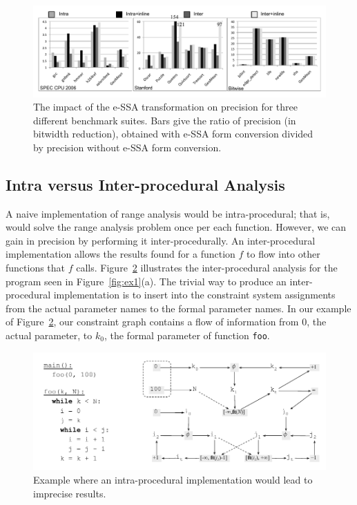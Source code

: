 \documentclass[times]{speauth}
\begin{document}
\begin{figure}[t!]
\begin{center}
\includegraphics[width=1\textwidth]{images/precESSA}
\end{center}
\caption{\label{fig:precESSA}
The impact of the e-SSA transformation on precision for three different
benchmark suites. Bars give the ratio of precision (in bitwidth reduction),
obtained with e-SSA form conversion divided by precision without e-SSA form
conversion.}
\end{figure}

\subsection{Intra versus Inter-procedural Analysis}
\label{sub:whole}

A naive implementation of range analysis would be intra-procedural; that is,
would solve the range analysis problem once per each function.
However, we can gain in precision by performing it inter-procedurally.
An inter-procedural implementation allows the results found for a function $f$
to flow into other functions that $f$ calls.
Figure~\ref{fig:intra} illustrates the inter-procedural analysis for the
program seen in Figure~\ref{fig:ex1}(a).
The trivial way to produce an inter-procedural implementation is to insert
into the constraint system assignments from the actual parameter names to the
formal parameter names.
In our example of Figure~\ref{fig:intra}, our constraint graph contains a flow
of information from $0$, the actual parameter, to $k_0$, the formal parameter
of function \texttt{foo}.

\begin{figure}[t!]
\begin{center}
\includegraphics[width=\textwidth]{images/intra}
\end{center}
\caption{\label{fig:intra}
Example where an intra-procedural implementation would lead to imprecise
results.
}
\end{figure}
\end{document}
